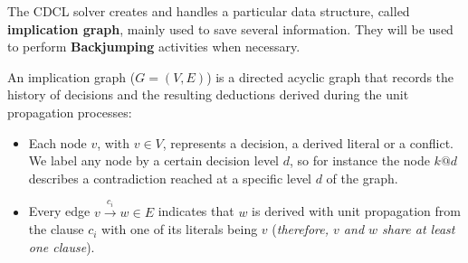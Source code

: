 The CDCL solver creates and handles a particular data structure, called \textbf{implication graph}, mainly used to save several information. They will be used 
to perform \textbf{Backjumping} activities when necessary. \vspace{7pt}

An implication graph ($G = (V, E)$) is a directed acyclic graph that records the history of decisions and the resulting deductions derived during the unit
propagation processes:
\begin{itemize}
    \renewcommand{\labelitemi}{-}
    \item Each node $v$, with $v \in V$, represents a decision, a derived literal or a conflict. We label any node by a certain decision level $d$, so for instance the node $k@d$ describes a contradiction reached at a specific level $d$ of the graph.
    \item Every edge $v \xrightarrow{c_i} w \in E$ indicates that $w$ is derived with unit propagation from the clause $c_i$ with one of its literals being $v$ (\textit{therefore, $v$ and $w$ share at least one clause}).
\end{itemize}
